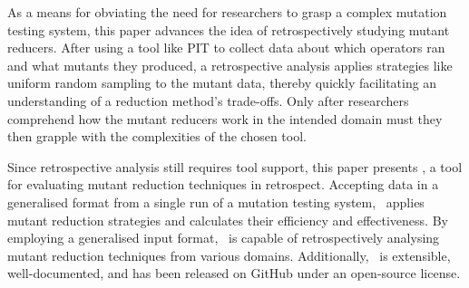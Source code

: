 



As a means for obviating the need for researchers to grasp a complex mutation testing system, this paper advances the
idea of retrospectively studying mutant reducers.  After using a tool like PIT to collect data about which operators ran
and what mutants they produced, a retrospective analysis applies strategies like uniform random sampling to the mutant
data, thereby quickly facilitating an understanding of a reduction method's trade-offs. Only after researchers
comprehend how the mutant reducers work in the intended domain must they then grapple with the complexities of the
chosen tool.


Since retrospective analysis still requires tool support, this paper presents \mr, a tool for evaluating mutant
reduction techniques in retrospect. Accepting data in a generalised format from a single run of a mutation testing
system, \mr~applies mutant reduction strategies and calculates their efficiency and effectiveness.  By employing a
generalised input format, \mr~is capable of retrospectively analysing mutant reduction techniques from various domains.
Additionally, \mr~is extensible, well-documented, and has been released on GitHub under an open-source license.



